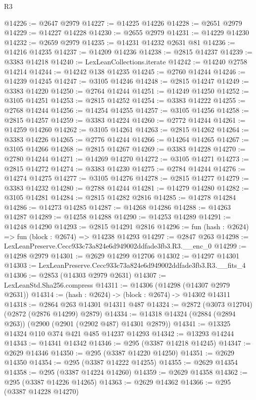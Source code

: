 \begin{lexlean}{R3}
\begin{coremodule}
@14226 := @2647 @2979
@14227 := @14225 @14226
@14228 := @2651 @2979
@14229 := @14227 @14228
@14230 := @2655 @2979
@14231 := @14229 @14230
@14232 := @2659 @2979
@14235 := @14231 @14232 @2631 @81
@14236 := @14216 @14235
@14237 := @14209 @14236
@14238 := @2815 @14237
@14239 := @3383 @14218
@14240 := LexLeanCollections.iterate
@14242 := @14240 @2758 @14214
@14244 := @14242 @138 @14235
@14245 := @2760 @14244
@14246 := @14239 @14245
@14247 := @3105 @14246
@14248 := @2815 @14247
@14249 := @3383 @14220
@14250 := @2764 @14244
@14251 := @14249 @14250
@14252 := @3105 @14251
@14253 := @2815 @14252
@14254 := @3383 @14222
@14255 := @2768 @14244
@14256 := @14254 @14255
@14257 := @3105 @14256
@14258 := @2815 @14257
@14259 := @3383 @14224
@14260 := @2772 @14244
@14261 := @14259 @14260
@14262 := @3105 @14261
@14263 := @2815 @14262
@14264 := @3383 @14226
@14265 := @2776 @14244
@14266 := @14264 @14265
@14267 := @3105 @14266
@14268 := @2815 @14267
@14269 := @3383 @14228
@14270 := @2780 @14244
@14271 := @14269 @14270
@14272 := @3105 @14271
@14273 := @2815 @14272
@14274 := @3383 @14230
@14275 := @2784 @14244
@14276 := @14274 @14275
@14277 := @3105 @14276
@14278 := @2815 @14277
@14279 := @3383 @14232
@14280 := @2788 @14244
@14281 := @14279 @14280
@14282 := @3105 @14281
@14284 := @2815 @14282 @2816
@14285 := @14278 @14284
@14286 := @14273 @14285
@14287 := @14268 @14286
@14288 := @14263 @14287
@14289 := @14258 @14288
@14290 := @14253 @14289
@14291 := @14248 @14290
@14293 := @2815 @14291 @2816
@14296 := fun (hash : @2624) => fun (block : @2674) => @14238 @14293
@14297 := @2847 @263
@14298 := LexLeanPreserve.Cecc933c73a824e6d949002ddfade3fb3.R3.__enc_0
@14299 := @14298 @2979
@14301 := @2629 @14299 @12706
@14302 := @14297 @14301
@14303 := LexLeanPreserve.Cecc933c73a824e6d949002ddfade3fb3.R3.__fits_4
@14306 := @2853 (@14303 @2979 @2631)
@14307 := LexLeanStd.Sha256.compress
@14311 := @14306 (@14298 (@14307 @2979 @2631))
@14314 := (hash : @2624) -> (block : @2674) -> @14302 @14311
@14318 := @2864 @263 @14301 @14311 @487
@14324 := @2872 (@3073 @12704) (@2872 (@2876 @14299) @2879)
@14334 := @14318 @14324 (@2884 (@2894 @263)) (@2900 (@2901 (@2902 @487) @14301 @2879))
@14341 := @13325 @14324 @110 @374 @421 @485 @14237 @14293
@14342 := @13293 @14244
@14343 := @14341 @14342
@14346 := @295 (@3387 @14218 @14245)
@14347 := @2629 @14346
@14350 := @295 (@3387 @14220 @14250)
@14351 := @2629 @14350
@14354 := @295 (@3387 @14222 @14255)
@14355 := @2629 @14354
@14358 := @295 (@3387 @14224 @14260)
@14359 := @2629 @14358
@14362 := @295 (@3387 @14226 @14265)
@14363 := @2629 @14362
@14366 := @295 (@3387 @14228 @14270)

\end{coremodule}
\end{lexlean}
